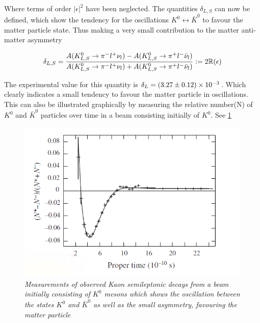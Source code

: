 \noindent Where terms of order $|\epsilon|^{2}$ have been neglected. The quantities $\delta_{L,S}$ can now be defined, which show the tendency for the oscillations $K^{0} \leftrightarrow \bar{K}^{0}$ to favour the matter particle state. Thus making a very small contribution to the matter anti-matter asymmetry

\begin{equation*}
\delta_{L,S} = \frac{A({K}^{0}_{L,S} \rightarrow \pi^{-} l^{+} \nu_{l}) - A({K}^{0}_{L,S} \rightarrow \pi^{+} l^{-} \bar{\nu}_{l})}{A({K}^{0}_{L,S} \rightarrow \pi^{-} l^{+} \nu_{l}) + A({K}^{0}_{L,S} \rightarrow \pi^{+} l^{-} \bar{\nu}_{l})} \vcentcolon= 2 \mathbb{R}(\epsilon)
\end{equation*}

\noindent The experimental value for this quantity is $\delta_{L} = (3.27 \pm 0.12) \times 10^{-3}$. Which clearly indicates a small tendency to favour the matter particle in oscillations. This can also be illustrated graphically by measuring the relative number(N) of $K^{0}$ and $\bar{K}^{0}$ particles over time in a beam consisting initially of $K^{0}$. See \cref{AsymmetryPicFig}

\begin{figure}[h!]
\begin{center}
\includegraphics[scale=0.4]{figs/Asymmetry_pic}
\end{center}
\caption{\textit{Measurements of observed Kaon semileptonic decays from a beam initially consisting of $K^{0}$ mesons which shows the oscillation between the states $K^{0}$ and $\bar{K}^{0}$ as well as the small asymmetry, favouring the matter particle \cite{AsymmetryPic}}}
\label{AsymmetryPicFig}
\end{figure}


